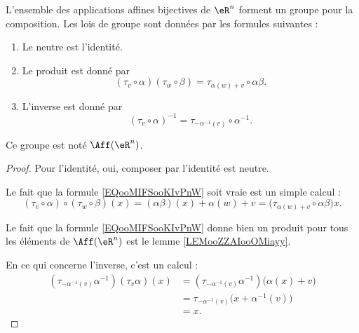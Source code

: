 \begin{propositionDef}      \label{PROPooBPKKooJRAMeT}
	L'ensemble des applications affines bijectives de \( \eR^n\) forment un groupe pour la composition. Les lois de groupe sont données par les formules suivantes :
	\begin{enumerate}
		\item
		      Le neutre est l'identité.
		\item       \label{ITEMooGUFRooMuhXds}
		      Le produit est donné par
		      \begin{equation}        \label{EQooMIFSooKIvPnW}
			      (\tau_v\circ \alpha)(\tau_w\circ \beta)=\tau_{\alpha(w)+v}\circ \alpha\beta.
		      \end{equation}
		\item       \label{ITEMooYOMSooRUDSdm}
		      L'inverse est donné par
		      \begin{equation}
			      (\tau_v\circ\alpha)^{-1}=\tau_{-\alpha^{-1}(v)}\circ \alpha^{-1}.
		      \end{equation}
	\end{enumerate}
	Ce groupe est noté \( \Aff(\eR^n)\).
\end{propositionDef}

\begin{proof}
	Pour l'identité, oui, composer par l'identité est neutre.

	Le fait que la formule \eqref{EQooMIFSooKIvPnW} soit vraie est un simple calcul :
	\begin{equation}
		(\tau_v\circ\alpha)\circ(\tau_w\circ\beta)(x)=(\alpha\beta)(x)+\alpha(w)+v=\big( \tau_{\alpha(w)+v}\circ \alpha\beta\big)x.
	\end{equation}

	Le fait que la formule \eqref{EQooMIFSooKIvPnW} donne bien un produit pour tous les éléments de \( \Aff(\eR^n)\) est le lemme \ref{LEMooZZAIooOMiayy}.

	En ce qui concerne l'inverse, c'est un calcul :
	\begin{subequations}
		\begin{align}
			(\tau_{-\alpha^{-1}(v)}\alpha^{-1})(\tau_v\alpha)(x) & =(\tau_{-\alpha^{-1}(v)}\alpha^{-1})\big( \alpha(x)+v \big) \\
			                                                     & =\tau_{-\alpha^{-1}(v)}\big( x+\alpha^{-1}(v) \big)         \\
			                                                     & =x.
		\end{align}
	\end{subequations}
\end{proof}


